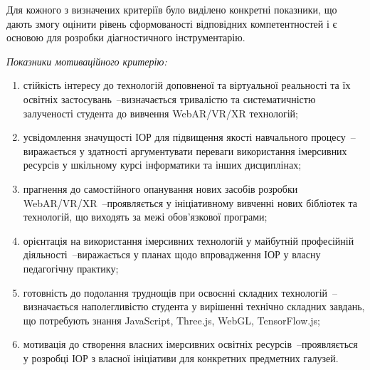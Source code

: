 Для кожного з визначених критеріїв було виділено конкретні показники, що дають змогу оцінити рівень сформованості відповідних компетентностей і є основою для розробки діагностичного інструментарію.

\textit{Показники мотиваційного критерію:}
\begin{enumerate}
\item стійкість інтересу до технологій доповненої та віртуальної реальності та їх освітніх застосувань~--визначається тривалістю та систематичністю залученості студента до вивчення WebAR/VR/XR технологій;
\item усвідомлення значущості ІОР для підвищення якості навчального процесу~--виражається у здатності аргументувати переваги використання імерсивних ресурсів у шкільному курсі інформатики та інших дисциплінах;
\item прагнення до самостійного опанування нових засобів розробки WebAR/VR/XR~--проявляється у ініціативному вивченні нових бібліотек та технологій, що виходять за межі обов'язкової програми;
\item орієнтація на використання імерсивних технологій у майбутній професійній діяльності~--виражається у планах щодо впровадження ІОР у власну педагогічну практику;
\item готовність до подолання труднощів при освоєнні складних технологій~--визначається наполегливістю студента у вирішенні технічно складних завдань, що потребують знання JavaScript, Three.js, WebGL, TensorFlow.js;
\item мотивація до створення власних імерсивних освітніх ресурсів~--проявляється у розробці ІОР з власної ініціативи для конкретних предметних галузей.
\end{enumerate}


